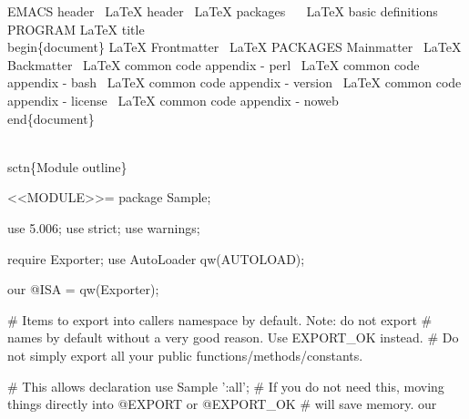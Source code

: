 \documentclass[11pt]{article}
\def\nwendcode{\endtrivlist \endgroup} %
\let\nwdocspar=\par                    %
\begin{document}
\nwenddocs{}\endmoddef
\LA{}EMACS header~{\nwtagstyle{}}\RA{}
\LA{}LaTeX header~{\nwtagstyle{}}\RA{}
\LA{}LaTeX packages~{\nwtagstyle{}}\RA{}
\ %
\LA{}LaTeX basic definitions~{\nwtagstyle{}}\RA{}
\LA{}PROGRAM LaTeX title~{\nwtagstyle{}}\RA{}
%
%
\\begin\{document\}
%
\LA{}LaTeX Frontmatter~{\nwtagstyle{}}\RA{}
\LA{}LaTeX PACKAGES Mainmatter~{\nwtagstyle{}}\RA{}
\LA{}LaTeX Backmatter~{\nwtagstyle{}}\RA{}
%
\LA{}LaTeX common code appendix - perl~{\nwtagstyle{}}\RA{}
\LA{}LaTeX common code appendix - bash~{\nwtagstyle{}}\RA{}
\LA{}LaTeX common code appendix - version~{\nwtagstyle{}}\RA{}
\LA{}LaTeX common code appendix - license~{\nwtagstyle{}}\RA{}
\LA{}LaTeX common code appendix - noweb~{\nwtagstyle{}}\RA{}
%
\\end\{document\}
%
\nwendcode{}\nwdocspar

\nwenddocs{}\endmoddef
\\sctn\{Module outline\}

<<MODULE>>=
package Sample;

use 5.006;
use strict;
use warnings;

require Exporter;
use AutoLoader qw(AUTOLOAD);

our @ISA = qw(Exporter);

# Items to export into callers namespace by default. Note: do not export
# names by default without a very good reason. Use EXPORT_OK instead.
# Do not simply export all your public functions/methods/constants.

# This allows declaration       use Sample ':all';
# If you do not need this, moving things directly into @EXPORT or @EXPORT_OK
# will save memory.
our %
\end{document}
